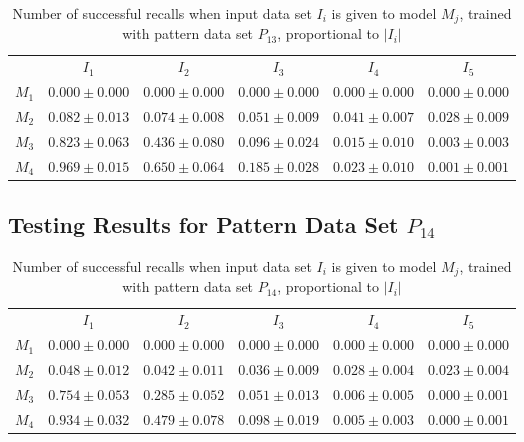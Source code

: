 \documentclass[12pt]{article}
\begin{document}
\begin{appendices}
\begin{table}[H]
\begin{tabular}{cccccc}
 & $I_{1}$  & $I_{2}$  & $I_{3}$  & $I_{4}$  & $I_{5}$ \\ \cline{2-6}
$M_{1}$  & $0.000\pm0.000$  & $0.000\pm0.000$  & $0.000\pm0.000$  & $0.000\pm0.000$  & $0.000\pm0.000$ \\
$M_{2}$  & $0.082\pm0.013$  & $0.074\pm0.008$  & $0.051\pm0.009$  & $0.041\pm0.007$  & $0.028\pm0.009$ \\
$M_{3}$  & $0.823\pm0.063$  & $0.436\pm0.080$  & $0.096\pm0.024$  & $0.015\pm0.010$  & $0.003\pm0.003$ \\
$M_{4}$  & $0.969\pm0.015$  & $0.650\pm0.064$  & $0.185\pm0.028$  & $0.023\pm0.010$  & $0.001\pm0.001$ \\

    \end{tabular}
    \caption{Number of successful recalls when input data set $I_i$ is given to model $M_j$, trained with pattern data set $P_{13}$, proportional to $\left|I_i\right|$}
    \end{table}
    
\subsection{Testing Results for Pattern Data Set $P_{14}$}


    \begin{table}[H]
    \centering
    \def\arraystretch{1.5}
    \footnotesize
    \begin{tabular}{cccccc}
    
 & $I_{1}$  & $I_{2}$  & $I_{3}$  & $I_{4}$  & $I_{5}$ \\ \cline{2-6}
$M_{1}$  & $0.000\pm0.000$  & $0.000\pm0.000$  & $0.000\pm0.000$  & $0.000\pm0.000$  & $0.000\pm0.000$ \\
$M_{2}$  & $0.048\pm0.012$  & $0.042\pm0.011$  & $0.036\pm0.009$  & $0.028\pm0.004$  & $0.023\pm0.004$ \\
$M_{3}$  & $0.754\pm0.053$  & $0.285\pm0.052$  & $0.051\pm0.013$  & $0.006\pm0.005$  & $0.000\pm0.001$ \\
$M_{4}$  & $0.934\pm0.032$  & $0.479\pm0.078$  & $0.098\pm0.019$  & $0.005\pm0.003$  & $0.000\pm0.001$ \\

    \end{tabular}
    \caption{Number of successful recalls when input data set $I_i$ is given to model $M_j$, trained with pattern data set $P_{14}$, proportional to $\left|I_i\right|$}
    \end{table}
    

\end{appendices}
\end{document}
